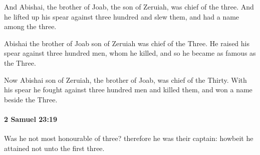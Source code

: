 			\begin{versebox}
					\item[BHS] 
					\item[ASV] And Abishai, the brother of Joab, the son of Zeruiah, was chief of the three. And he lifted up his spear against three hundred and slew them, and had a name among the three.
					\item[NIV] Abishai the brother of Joab son of Zeruiah was chief of the Three. He raised his spear against three hundred men, whom he killed, and so he became as famous as the Three.
					\item[NRSV] Now Abishai son of Zeruiah, the brother of Joab, was chief of the Thirty. With his spear he fought against three hundred men and killed them, and won a name beside the Three.
			\end{versebox}

		\paragraph{2 Samuel 23:19} %
			\label{2SAMUEL-23-19}

			Was he not most honourable of three? therefore he was their captain: howbeit he attained not unto the first three.

